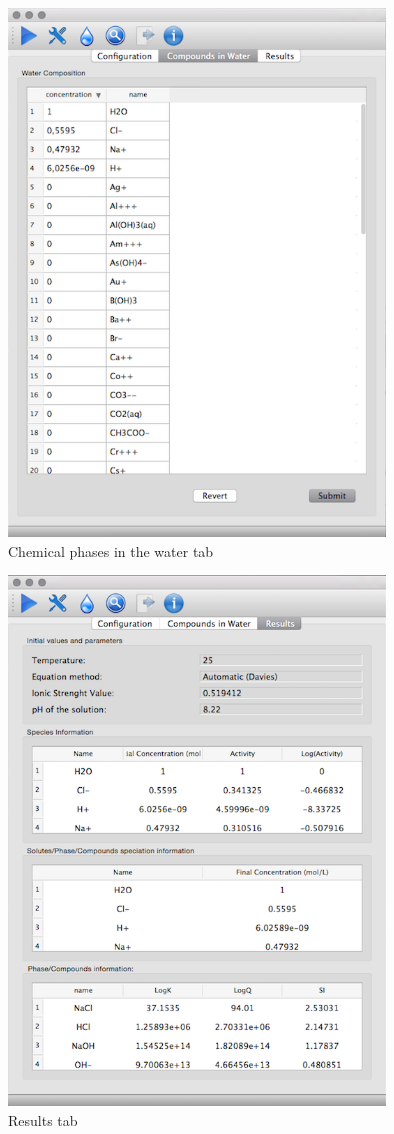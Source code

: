 \begin{figure}[ht!]
\centering
\includegraphics[width=100mm]{figures/shpeck-watertab.png}
\caption{Chemical phases in the water tab}
\label{fig:water}
\end{figure}

\begin{figure}[ht!]
\centering
\includegraphics[width=100mm]{figures/shpeck-resultstab.png}
\caption{Results tab}
\label{fig:output}
\end{figure}


